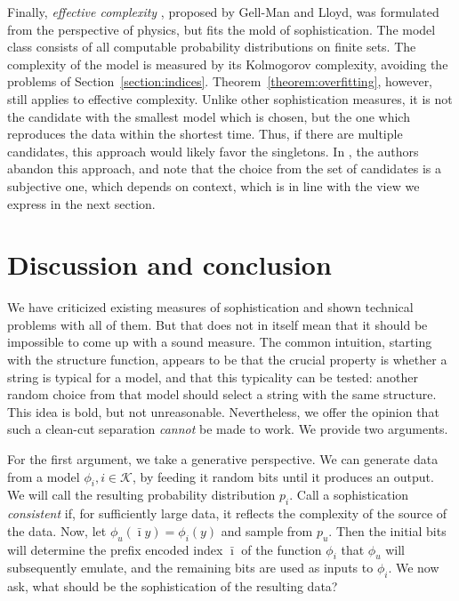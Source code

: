\documentclass{style/llncs}
\newcommand{\K}{\mathscr K}
\begin{document}
Finally, \emph{effective complexity} \cite{gellmann1996information}, proposed by Gell-Man and Lloyd, was formulated from the perspective of physics, but fits the mold of sophistication. The model class consists of all computable probability distributions on finite sets. The complexity of the model is measured by its Kolmogorov complexity, avoiding the problems of Section~\ref{section:indices}. Theorem~\ref{theorem:overfitting}, however, still applies to effective complexity. Unlike other sophistication measures, it is not the candidate with the smallest model which is chosen, but the one which reproduces the data within the shortest time. Thus, if there are multiple candidates, this approach would likely favor the singletons. In \cite{gell2004nonextensive}, the authors abandon this approach, and note that the choice from the set of candidates is a subjective one, which depends on context, which is in line with the view we express in the next section.

\section{Discussion and conclusion}
\label{section:conclusion} 

We have criticized existing measures of sophistication and shown technical problems with all of them. But that does not in itself mean that it should be impossible to come up with a sound measure. The common intuition, starting with the structure function, appears to be that the crucial property is whether a string is typical for a model, and that this typicality can be tested: another random choice from that model should select a string with the same structure. This idea is bold, but not  unreasonable. Nevertheless, we offer the opinion that such a clean-cut separation \emph{cannot} be made to work. We provide two arguments.

For the first argument, we take a generative perspective. We can generate data from a model $\phi_i, i \in \K$, by feeding it random bits until it produces an output. We will call the resulting probability distribution $p_i$. Call a sophistication \emph{consistent} if, for sufficiently large data, it reflects the complexity of the source of the data. Now, let $\phi_u(\bar\imath y)=\phi_i(y)$ and sample from $p_u$. Then the initial bits will determine the prefix encoded index $\bar\imath$ of the function $\phi_i$ that $\phi_u$ will subsequently emulate, and the remaining bits are used as inputs to $\phi_i$. We now ask, what should be the sophistication of the resulting data? 
 
\end{document}
